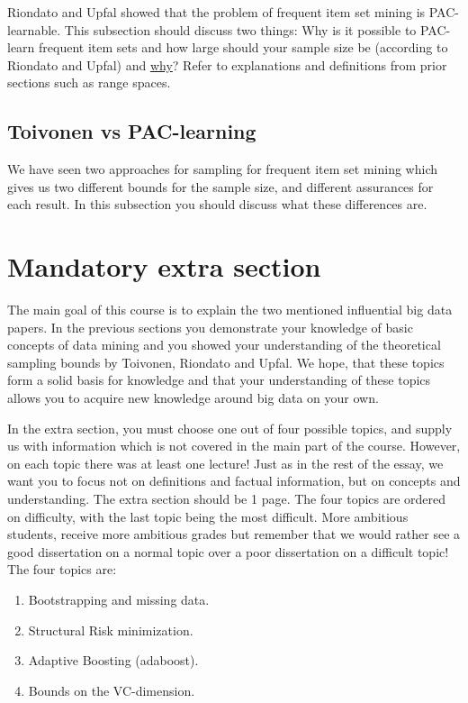 \documentclass{bigdata}
\begin{document}
Riondato and Upfal showed that the problem of frequent item set mining is PAC-learnable. This subsection should discuss two things:
Why is it possible to PAC-learn frequent item sets and how large should your sample size be (according to Riondato and Upfal) and \underline{why}? Refer to explanations and definitions from prior sections such as range spaces.

\subsection{Toivonen vs PAC-learning}

We have seen two approaches for sampling for frequent item set mining which gives us two different bounds for the sample size, and different assurances for each result.
In this subsection you should discuss what these differences are.


\section{Mandatory extra section}

The main goal of this course is to explain the two mentioned influential big data papers. In the previous sections you demonstrate your knowledge of basic concepts of data mining and you showed your understanding of the theoretical sampling bounds by Toivonen, Riondato and Upfal. We hope, that these topics form a solid basis for knowledge and that your understanding of these topics allows you to acquire new knowledge around big data on your own. 

In the extra section, you must choose one out of four possible topics, and supply us with information which is not covered in the main part of the course. However, on each topic there was at least one lecture! Just as in the rest of the essay, we want you to focus not on definitions and factual information, but on concepts and understanding. The extra section should be 1 page. The four topics are ordered on difficulty, with the last topic being the most difficult. More ambitious students, receive more ambitious grades but remember that we would rather see a good dissertation on a normal topic over a poor dissertation on a difficult topic! The four topics are:

\begin{enumerate}
    \item Bootstrapping and missing data.
    \item Structural Risk minimization.
    \item Adaptive Boosting (adaboost).
    \item Bounds on the VC-dimension.
\end{enumerate}
\end{document}
